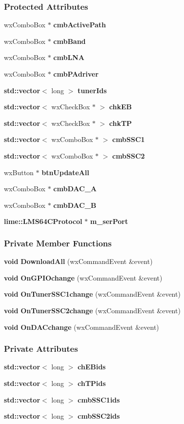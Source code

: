 \subsubsection*{Protected Attributes}
\begin{DoxyCompactItemize}
\item 
wx\+Combo\+Box $\ast$ {\bf cmb\+Active\+Path}
\item 
wx\+Combo\+Box $\ast$ {\bf cmb\+Band}
\item 
wx\+Combo\+Box $\ast$ {\bf cmb\+L\+NA}
\item 
wx\+Combo\+Box $\ast$ {\bf cmb\+P\+Adriver}
\item 
{\bf std\+::vector}$<$ long $>$ {\bf tuner\+Ids}
\item 
{\bf std\+::vector}$<$ wx\+Check\+Box $\ast$ $>$ {\bf chk\+EB}
\item 
{\bf std\+::vector}$<$ wx\+Check\+Box $\ast$ $>$ {\bf chk\+TP}
\item 
{\bf std\+::vector}$<$ wx\+Combo\+Box $\ast$ $>$ {\bf cmb\+S\+S\+C1}
\item 
{\bf std\+::vector}$<$ wx\+Combo\+Box $\ast$ $>$ {\bf cmb\+S\+S\+C2}
\item 
wx\+Button $\ast$ {\bf btn\+Update\+All}
\item 
wx\+Combo\+Box $\ast$ {\bf cmb\+D\+A\+C\+\_\+A}
\item 
wx\+Combo\+Box $\ast$ {\bf cmb\+D\+A\+C\+\_\+B}
\item 
{\bf lime\+::\+L\+M\+S64\+C\+Protocol} $\ast$ {\bf m\+\_\+ser\+Port}
\end{DoxyCompactItemize}
\subsubsection*{Private Member Functions}
\begin{DoxyCompactItemize}
\item 
{\bf void} {\bf Download\+All} (wx\+Command\+Event \&event)
\item 
{\bf void} {\bf On\+G\+P\+I\+Ochange} (wx\+Command\+Event \&event)
\item 
{\bf void} {\bf On\+Tuner\+S\+S\+C1change} (wx\+Command\+Event \&event)
\item 
{\bf void} {\bf On\+Tuner\+S\+S\+C2change} (wx\+Command\+Event \&event)
\item 
{\bf void} {\bf On\+D\+A\+Cchange} (wx\+Command\+Event \&event)
\end{DoxyCompactItemize}
\subsubsection*{Private Attributes}
\begin{DoxyCompactItemize}
\item 
{\bf std\+::vector}$<$ long $>$ {\bf ch\+E\+Bids}
\item 
{\bf std\+::vector}$<$ long $>$ {\bf ch\+T\+Pids}
\item 
{\bf std\+::vector}$<$ long $>$ {\bf cmb\+S\+S\+C1ids}
\item 
{\bf std\+::vector}$<$ long $>$ {\bf cmb\+S\+S\+C2ids}
\end{DoxyCompactItemize}


